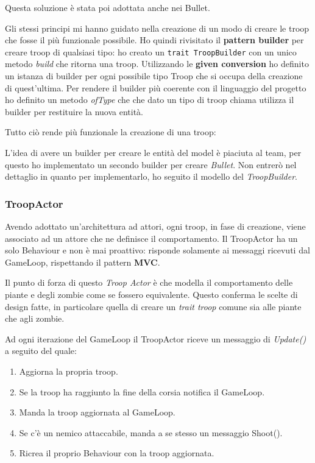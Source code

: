 

Questa soluzione è stata poi adottata anche nei Bullet.

Gli stessi principi mi hanno guidato nella creazione di un modo di creare le troop che fosse il più funzionale possibile.
Ho quindi rivisitato il \textbf{pattern builder} per creare troop di qualsiasi tipo: ho creato un \texttt{trait TroopBuilder}
con un unico metodo \textit{build} che ritorna una troop.
Utilizzando le \textbf{given conversion} ho definito un istanza di builder per ogni possibile tipo Troop che si occupa
della creazione di quest'ultima.
Per rendere il builder più coerente con il linguaggio del progetto ho definito un metodo \textit{ofType} che che dato un tipo
di troop chiama utilizza il builder per restituire la nuova entità.



Tutto ciò rende più funzionale la creazione di una troop:



L'idea di avere un builder per creare le entità del model è piaciuta al team, per questo ho implementato un secondo builder per creare \textit{Bullet}.
Non entrerò nel dettaglio in quanto per implementarlo, ho seguito il modello del \textit{TroopBuilder}.

\subsubsection{TroopActor}
Avendo adottato un'architettura ad attori, ogni troop, in fase di creazione, viene associato ad un attore che ne definisce il comportamento.
Il TroopActor ha un solo Behaviour e non è mai proattivo: risponde solamente ai messaggi ricevuti dal GameLoop, rispettando il pattern \textbf{MVC}.

Il punto di forza di questo \textit{Troop Actor} è che modella il comportamento delle piante e degli zombie come se fossero equivalente.
Questo conferma le scelte di design fatte, in particolare quella di creare un \textit{trait troop} comune sia alle piante che agli zombie.

Ad ogni iterazione del GameLoop il TroopActor riceve un messaggio di \textit{Update()} a seguito del quale:
\begin{enumerate}
    \item Aggiorna la propria troop.
    \item Se la troop ha raggiunto la fine della corsia notifica il GameLoop.
    \item Manda la troop aggiornata al GameLoop.
    \item Se c'è un nemico attaccabile, manda a se stesso un messaggio Shoot().
    \item Ricrea il proprio Behaviour con la troop aggiornata.
\end{enumerate}

